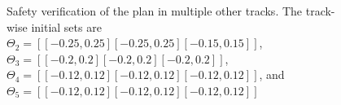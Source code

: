 \begin{figure}
    \caption{Safety verification of the plan in multiple other tracks. The track-wise initial sets are $\Theta_{2} = [[-0.25, 0.25][-0.25, 0.25][-0.15,0.15]]$, $\Theta_{3} = [[-0.2, 0.2][-0.2, 0.2][-0.2,0.2]]$, $\Theta_{4} = [[-0.12, 0.12][-0.12, 0.12][-0.12,0.12]]$, and $\Theta_{5} = [[-0.12, 0.12][-0.12, 0.12][-0.12,0.12]]$}
\label{fig:eval_track2-track3-track4-track5}
\end{figure}
